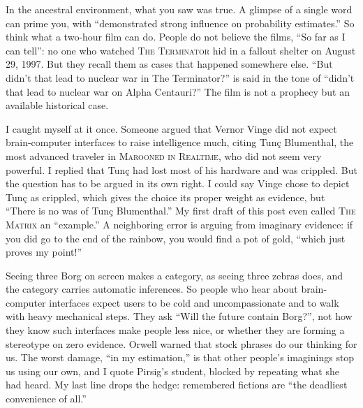 In the ancestral environment, what you saw was true. A glimpse of a single word can prime you, with ``demonstrated strong influence on probability estimates.'' So think what a two-hour film can do.  People do not believe the films, ``So far as I can tell'': no one who watched \textsc{The Terminator} hid in a fallout shelter on August 29, 1997. But they recall them as cases that happened somewhere else. ``But didn't that lead to nuclear war in The Terminator?'' is said in the tone of ``didn't that lead to nuclear war on Alpha Centauri?'' The film is not a prophecy but an available historical case. 

I caught myself at it once. Someone argued that Vernor Vinge did not expect brain-computer interfaces to raise intelligence much, citing Tunç Blumenthal, the most advanced traveler in \textsc{Marooned in Realtime}, who did not seem very powerful. I replied that Tunç had lost most of his hardware and was crippled. But the question has to be argued in its own right. I could say Vinge chose to depict Tunç as crippled, which gives the choice its proper weight as evidence, but ``There is no was of Tunç Blumenthal.'' My first draft of this post even called \textsc{The Matrix} an ``example.'' A neighboring error is arguing from imaginary evidence: if you did go to the end of the rainbow, you would find a pot of gold, ``which just proves my point!''

Seeing three Borg on screen makes a category, as seeing three zebras does, and the category carries automatic inferences. So people who hear about brain-computer interfaces expect users to be cold and uncompassionate and to walk with heavy mechanical steps. They ask ``Will the future contain Borg?'', not how they know such interfaces make people less nice, or whether they are forming a stereotype on zero evidence. Orwell warned that stock phrases do our thinking for us. The worst damage, ``in my estimation,'' is that other people's imaginings stop us using our own, and I quote Pirsig's student, blocked by repeating what she had heard.  My last line drops the hedge: remembered fictions are ``the deadliest convenience of all.''
